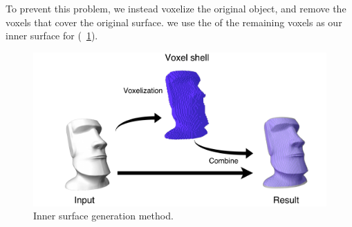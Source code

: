 To prevent this problem, we instead voxelize the original object, and remove the voxels that cover the original surface.
 we use the  of the remaining voxels as our inner surface for (\figname~\ref{fig:inner_surface}).

\begin{figure}[ht]
\centering
\includegraphics[width=1.0\linewidth]{figs/inner2.pdf} 
\caption{Inner surface generation method.}
\label{fig:inner_surface}
\end{figure}


